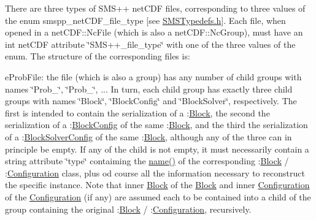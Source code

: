 There are three types of S\+M\+S++ net\+C\+DF files, corresponding to three values of the enum smspp\+\_\+net\+C\+D\+F\+\_\+file\+\_\+type \mbox{[}see \mbox{\hyperlink{_s_m_s_typedefs_8h}{S\+M\+S\+Typedefs.\+h}}\mbox{]}. Each file, when opened in a net\+C\+D\+F\+::\+Nc\+File (which is also a net\+C\+D\+F\+::\+Nc\+Group), must have an int net\+C\+DF attribute \char`\"{}\+S\+M\+S++\+\_\+file\+\_\+type\char`\"{} with one of the three values of the enum. The structure of the corresponding files is\+:


\begin{DoxyItemize}
\item e\+Prob\+File\+: the file (which is also a group) has any number of child groups with names \char`\"{}\+Prob\+\_\char`\"{}, \char`\"{}\+Prob\+\_\char`\"{}, ... In turn, each child group has exactly three child groups with names \char`\"{}\+Block\char`\"{}, \char`\"{}\+Block\+Config\char`\"{} and \char`\"{}\+Block\+Solver\char`\"{}, respectively. The first is intended to contain the serialization of a \+:\mbox{\hyperlink{class_s_m_spp__di__unipi__it_1_1_block}{Block}}, the second the serialization of a \+:\mbox{\hyperlink{class_s_m_spp__di__unipi__it_1_1_block_config}{Block\+Config}} of the same \+:\mbox{\hyperlink{class_s_m_spp__di__unipi__it_1_1_block}{Block}}, and the third the serialization of a \+:\mbox{\hyperlink{class_s_m_spp__di__unipi__it_1_1_block_solver_config}{Block\+Solver\+Config}} of the same \+:\mbox{\hyperlink{class_s_m_spp__di__unipi__it_1_1_block}{Block}}, although any of the three can in principle be empty. If any of the child is not empty, it must necessarily contain a string attribute \char`\"{}type\char`\"{} contaiming the \mbox{\hyperlink{class_s_m_spp__di__unipi__it_1_1_block_a738e9dfd6e00507da219e4bd5a3f6be9}{name()}} of the corresponding \+:\mbox{\hyperlink{class_s_m_spp__di__unipi__it_1_1_block}{Block}} / \+:\mbox{\hyperlink{class_s_m_spp__di__unipi__it_1_1_configuration}{Configuration}} class, plus od course all the information necessary to reconstruct the specific instance. Note that inner \mbox{\hyperlink{class_s_m_spp__di__unipi__it_1_1_block}{Block}} of the \mbox{\hyperlink{class_s_m_spp__di__unipi__it_1_1_block}{Block}} and inner \mbox{\hyperlink{class_s_m_spp__di__unipi__it_1_1_configuration}{Configuration}} of the \mbox{\hyperlink{class_s_m_spp__di__unipi__it_1_1_configuration}{Configuration}} (if any) are assumed each to be contained into a child of the group containing the original \+:\mbox{\hyperlink{class_s_m_spp__di__unipi__it_1_1_block}{Block}} / \+:\mbox{\hyperlink{class_s_m_spp__di__unipi__it_1_1_configuration}{Configuration}}, recursively.

\end{DoxyItemize}
